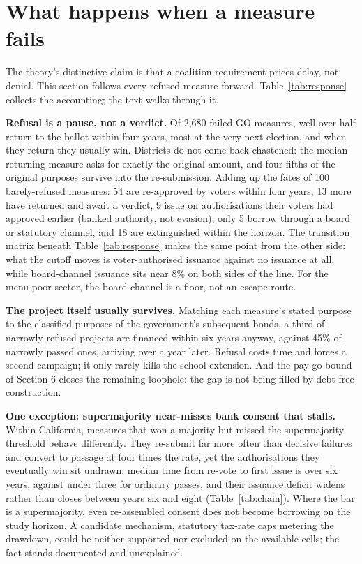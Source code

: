 \section{What happens when a measure fails}
The theory's distinctive claim is that a coalition requirement prices delay, not denial. This section follows every refused measure forward. Table~\ref{tab:response} collects the accounting; the text walks through it.


\textbf{Refusal is a pause, not a verdict.} Of 2,680 failed GO measures, well over half return to the ballot within four years, most at the very next election, and when they return they usually win. Districts do not come back chastened: the median returning measure asks for exactly the original amount, and four-fifths of the original purposes survive into the re-submission. Adding up the fates of 100 barely-refused measures: 54 are re-approved by voters within four years, 13 more have returned and await a verdict, 9 issue on authorisations their voters had approved earlier (banked authority, not evasion), only 5 borrow through a board or statutory channel, and 18 are extinguished within the horizon. The transition matrix beneath Table~\ref{tab:response} makes the same point from the other side: what the cutoff moves is voter-authorised issuance against no issuance at all, while board-channel issuance sits near 8\% on both sides of the line. For the menu-poor sector, the board channel is a floor, not an escape route.

\textbf{The project itself usually survives.} Matching each measure's stated purpose to the classified purposes of the government's subsequent bonds, a third of narrowly refused projects are financed within six years anyway, against 45\% of narrowly passed ones, arriving over a year later. Refusal costs time and forces a second campaign; it only rarely kills the school extension. And the pay-go bound of Section 6 closes the remaining loophole: the gap is not being filled by debt-free construction.

\textbf{One exception: supermajority near-misses bank consent that stalls.} Within California, measures that won a majority but missed the supermajority threshold behave differently. They re-submit far more often than decisive failures and convert to passage at four times the rate, yet the authorisations they eventually win sit undrawn: median time from re-vote to first issue is over six years, against under three for ordinary passes, and their issuance deficit widens rather than closes between years six and eight (Table~\ref{tab:chain}). Where the bar is a supermajority, even re-assembled consent does not become borrowing on the study horizon. A candidate mechanism, statutory tax-rate caps metering the drawdown, could be neither supported nor excluded on the available cells; the fact stands documented and unexplained.

